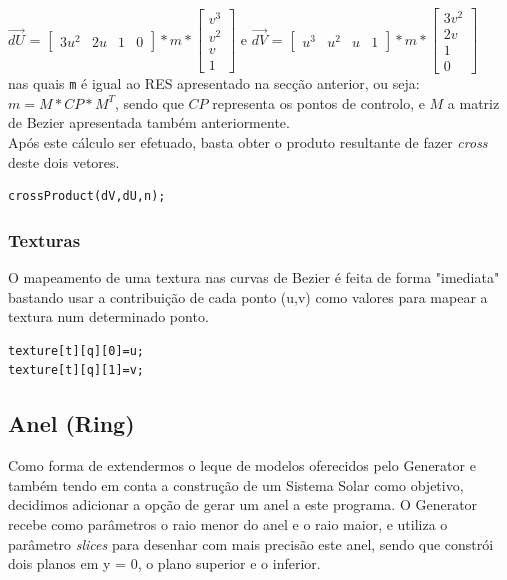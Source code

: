 \documentclass{article}
\begin{document}
$\overrightarrow{dU}$ = $\begin{bmatrix} 3u^2 & 2u & 1 & 0 \end{bmatrix} * m * \begin{bmatrix} v^3 \\ v^2 \\ v \\ 1 \end{bmatrix}$ e $\overrightarrow{dV}$ = $\begin{bmatrix} u^3 & u^2 & u & 1 \end{bmatrix} * m * \begin{bmatrix} 3v^2 \\ 2v \\ 1 \\ 0 \end{bmatrix}$\\
nas quais \texttt{m} é igual ao RES apresentado na secção anterior, ou seja:\\
$m = M * CP * M^T$, sendo que $CP$ representa os pontos de controlo, e $M$ a matriz de Bezier apresentada também anteriormente.\\
Após este cálculo ser efetuado, basta obter o produto resultante de fazer \textit{cross} deste dois vetores.

\begin{verbatim}
crossProduct(dV,dU,n);
\end{verbatim}

\subsubsection{Texturas}
O mapeamento de uma textura nas curvas de Bezier é feita de forma "imediata" bastando usar a contribuição de cada ponto (u,v) como valores para mapear a textura num determinado ponto.

\begin{verbatim}
texture[t][q][0]=u;
texture[t][q][1]=v;
\end{verbatim}

\subsection{Anel (Ring)}
Como forma de extendermos o leque de modelos oferecidos pelo Generator e também tendo em conta a construção de um Sistema Solar como objetivo, decidimos adicionar a opção de gerar um anel a este programa. O Generator recebe como parâmetros o raio menor do anel e o raio maior, e utiliza o parâmetro \textit{slices} para desenhar com mais precisão este anel, sendo que constrói dois planos em y = 0, o plano superior e o inferior.
\end{document}
